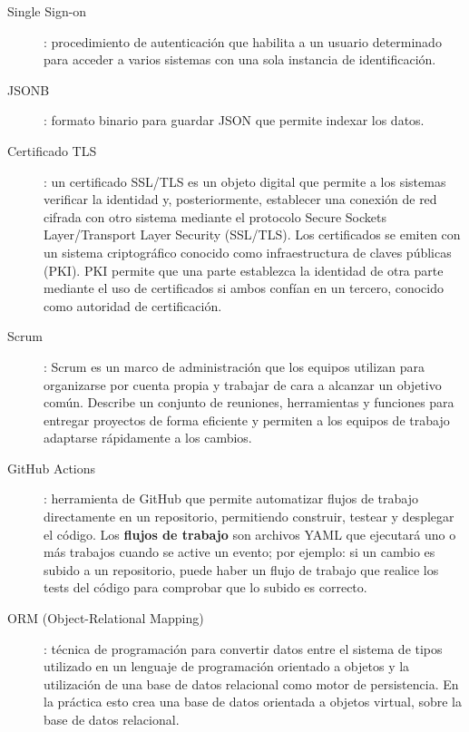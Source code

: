 \begin{description}
    \item[\hypertarget{singleSignOn}{Single Sign-on}]: procedimiento de autenticación que habilita a un usuario determinado para 
    acceder a varios sistemas con una sola instancia de identificación.

    \item[\hypertarget{jsonb}{JSONB}]: formato binario para guardar JSON que permite indexar los datos.
    
    \item[\hypertarget{certificadoTls}{Certificado TLS}]: un certificado SSL/TLS es un objeto digital que permite a los sistemas 
    verificar la identidad y, posteriormente, establecer una conexión de red cifrada con otro sistema mediante el protocolo 
    Secure Sockets Layer/Transport Layer Security (SSL/TLS). Los certificados se emiten con un sistema criptográfico conocido 
    como infraestructura de claves públicas (PKI). PKI permite que una parte establezca la identidad de otra parte mediante el 
    uso de certificados si ambos confían en un tercero, conocido como autoridad de certificación. 

    \item[\hypertarget{scrum}{Scrum}]: Scrum es un marco de administración que los equipos utilizan para organizarse por cuenta 
    propia y trabajar de cara a alcanzar un objetivo común. Describe un conjunto de reuniones, herramientas y funciones para 
    entregar proyectos de forma eficiente y permiten a los equipos de trabajo adaptarse rápidamente a los cambios.

    \item[\hypertarget{githubActions}{GitHub Actions}]: herramienta de GitHub que permite automatizar flujos de trabajo directamente en
    un repositorio, permitiendo construir, testear y desplegar el código. Los \textbf{flujos de trabajo} son archivos YAML que ejecutará   
    uno o más trabajos cuando se active un evento; por ejemplo: si un cambio es subido a un repositorio, puede haber un flujo de trabajo
    que realice los tests del código para comprobar que lo subido es correcto.

    \item[\hypertarget{orm}{ORM (Object-Relational Mapping)}]: técnica de programación para convertir datos entre el sistema de tipos 
    utilizado en un lenguaje de programación orientado a objetos y la utilización de una base de datos relacional como motor de persistencia. 
    En la práctica esto crea una base de datos orientada a objetos virtual, sobre la base de datos relacional.


\end{description}
